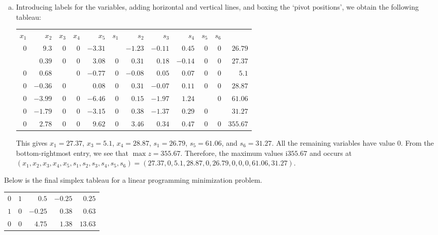 \documentclass[11pt,letterpaper]{article}
\begin{document}
\begin{enumerate}[(a)]
\item Introducing labels for the variables, adding horizontal and vertical lines, and boxing the `pivot positions', we obtain the following tableau: \par
	\begin{table}[H]
	\centering
	\begin{tabular}{rrrrrrrrrrrr}
	{\footnotesize $x_1$} & {\footnotesize $x_2$} & {\footnotesize $x_3$} & {\footnotesize $x_4$} & {\footnotesize $x_5$} & {\footnotesize $s_1$} & {\footnotesize $s_2$} & {\footnotesize $s_3$} & {\footnotesize $s_4$} & {\footnotesize $s_5$} & {\footnotesize $s_6$} & \\ 	
	$0$ & $9.3$ & $0$ & $0$ & $-3.31$ & \boxed{$1$} & $-1.23$ & $-0.11$ & $0.45$ & $0$ & \multicolumn{1}{r|}{$0$} & $26.79$ \\
	\boxed{$1$} & $0.39$ & $0$ & $0$ & $3.08$ & $0$ & $0.31$ & $0.18$ & $-0.14$ & $0$ & \multicolumn{1}{r|}{$0$} & $27.37$ \\
	$0$ & $0.68$ & \boxed{$1$} & $0$ & $-0.77$ & $0$ & $-0.08$ & $0.05$ & $0.07$ & $0$ & \multicolumn{1}{r|}{$0$} & $5.1$ \\
	$0$ & $-0.36$ & $0$ & \boxed{$1$} & $0.08$ & $0$ & $0.31$ & $-0.07$ & $0.11$ & $0$ & \multicolumn{1}{r|}{$0$} & $28.87$ \\
	$0$ & $-3.99$ & $0$ & $0$ & $-6.46$ & $0$ & $0.15$ & $-1.97$ & $1.24$ & \boxed{$1$} & \multicolumn{1}{r|}{$0$} & $61.06$ \\
	$0$ & $-1.79$ & $0$ & $0$ & $-3.15$ & $0$ & $0.38$ & $-1.37$ & $0.29$ & $0$ & \multicolumn{1}{r|}{\boxed{$1$}} & $31.27$ \\ \hline
	$0$ & $2.78$ & $0$ & $0$ & $9.62$ & $0$ & $3.46$ & $0.34$ & $0.47$ & $0$ & \multicolumn{1}{r|}{$0$} & $355.67$
	\end{tabular}
	\end{table}
This gives $x_1= 27.37$, $x_3= 5.1$, $x_4= 28.87$, $s_1= 26.79$, $s_5= 61.06$, and $s_6= 31.27$. All the remaining variables have value $0$. From the bottom-rightmost entry, we see that $\max z= 355.67$. Therefore, the maximum values i$ 355.67$ and occurs at $(x_1, x_2, x_3, x_4, x_5, s_1, s_2, s_3, s_4, s_5, s_6)= (27.37, 0, 5.1, 28.87, 0, 26.79, 0, 0, 0, 61.06, 31.27)$. 
\end{enumerate}



\newpage



 Below is the final simplex tableau for a linear programming minimization problem. \par
	\begin{table}[H]
	\centering
	\begin{tabular}{rrrrr}
	$0$ & $1$ & $0.5$ & $-0.25$ & $0.25$ \\
	$1$ & $0$ & $-0.25$ & $0.38$ & $0.63$ \\
	$0$ & $0$ & $4.75$ & $1.38$ & $13.63$
	\end{tabular}
	\end{table}
\end{document}
